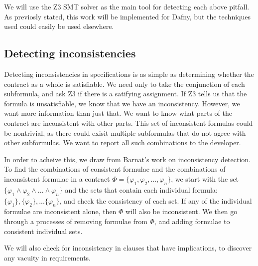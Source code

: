 \documentclass{article}
\newif\ifcomments
\newcommand{\egm}[1]{\ifcomments\textcolor{orange}{egm: #1}\fi}
\begin{document}
We will use the Z3 SMT solver as the main tool for detecting each above pitfall. As previosly stated,
this work will be implemented for Dafny, but the techniques used could easily be used elsewhere.

\subsection*{Detecting inconsistencies}
\egm{I now wonder if we should change inconsitencies to contradictions and use the term contradiction every where? Thoughts?}

Detecting inconsistencies in specifications is as simple as determining whether the contract as a whole is satisfiable.
We need only to take the conjunction of each subformula, and ask Z3 if there is a satifying assignment. If Z3 tells us that the
formula is unsatisfiable, we know that we have an inconsistency. However, we want more information than just that. We
want to know what parts of the contract are inconsistent with other parts. This set of inconsistent formulas could be
nontrivial, as there could exisit multiple subformulas that do not agree with other subformulas. We want to report all
such combinations to the developer.

In order to acheive this, we draw from Barnat's \cite{barnat2016analysing} work on inconsistency detection.
To find the combinations of consistent formulae and the combinations of inconsistent formulae in a contract
\(\Phi = \{\varphi_{1}, \varphi_{2}, ..., \varphi_{n}\}\), we start with the set \(\{\varphi_{1} \land \varphi_{2} \land ... \land \varphi_{n}\} \)
and the sets that contain each individual formula: \(\{\varphi_{1}\}, \{\varphi_{2}\}, ... \{\varphi_{n}\} \), and check
the consistency of each set. If any of the individual formulae are inconsistent alone, then \(\Phi\) will also be inconsistent.
We then go through a processes of removing formulae from \(\Phi\), and adding formulae to consistent individual sets.

We will also check for inconsistency in clauses that have implications, to discover any vacuity in requirements.
\egm{There should be some related work with what is called an \emph{unsat core} from the SMT literature. The issue is that when an SMT solver says there is not satisfying assignment, people want proof that such is really the case as it would be down to a defect in the SMT solver implementation. The unsat core is a proof certificate that the problem truly cannot be satisfied. It may be worth looking at some of the work with unsat cores.} 
\end{document}
